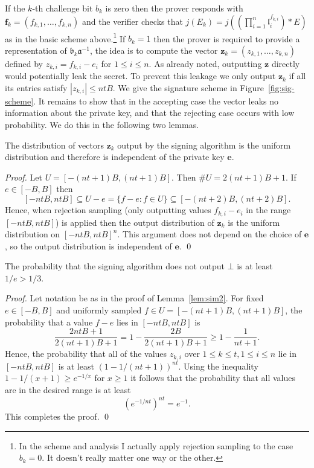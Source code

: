 \documentclass{llncs}
\renewcommand{\a}{\mathfrak{a}}
\renewcommand{\b}{\mathfrak{b}}
\renewcommand{\l}{\mathfrak{l}}
\newcommand{\e}{\textbf{e}}
\newcommand{\f}{\textbf{f}}
\newcommand{\z}{\textbf{z}}
\begin{document}
If the $k$-th challenge bit $b_k$ is zero then the prover responds with $\f_k = ( f_{k,1}, \dots, f_{k,n} )$ and the verifier checks that $j(E_k) = j( (\prod_{i=1}^n \l_i^{f_{k,i}}) * E )$ as in the basic scheme above.\footnote{In the scheme and analysis I actually apply rejection sampling to the case $b_k = 0$. It doesn't really matter one way or the other.}
If $b_k = 1$ then the prover is required to provide a representation of $\b_k \a^{-1}$, the idea is to compute the vector $\z_k = (z_{k,1}, \dots, z_{k,n}) $ defined by $z_{k,i} = f_{k,i} - e_i $ for $1 \le i \le n$.
As already noted, outputting $\z$ directly would potentially leak the secret.
To prevent this leakage we only output $\z_k$ if all its entries satisfy $| z_{k,i} | \le nt B$.
We give the signature scheme in Figure~\ref{fig:sig-scheme}.
It remains to show that in the accepting case the vector leaks no information about the private key, and that the rejecting case occurs with low probability. We do this in the following two lemmas.

\begin{lemma} \label{lem:sim2}
The distribution of vectors $\z_k$ output by the signing algorithm is the uniform distribution and therefore is independent of the private key $\e$.
\end{lemma}

\begin{proof}
Let $U = [-(nt+1)B, (nt+1)B]$. Then $\#U = 2(nt + 1)B + 1$.
If $e \in [-B, B]$ then 
\[
    [-ntB, ntB] \subseteq  U - e = \{ f - e : f \in U \} \subseteq [-(nt+2)B, (nt+2)B ].
\]
Hence, when rejection sampling (only outputting values $f_{k,i} - e_i$ in the range $[-ntB, ntB]$) is applied then the output distribution of $\z_k$ is the uniform distribution on $[-ntB, ntB]^n$.
This argument does not depend on the choice of $\e$, so the output distribution is independent of $\e$. \qed
\end{proof}



\begin{lemma}\label{lem:rejection}
The probability that the signing algorithm does not output $\bot$ is at least $1/e > 1/3$.
\end{lemma}

\begin{proof}
Let notation be as in the proof of Lemma~\ref{lem:sim2}.
For fixed $e \in [-B, B]$ and uniformly sampled $f \in U = [-(nt+1)B, (nt+1)B]$, the probability that a value $f-e$ lies in $[-ntB, ntB]$ is
\[
   \frac{2ntB + 1}{2(nt+1)B + 1}  = 1 - \frac{2B}{2(nt+1)B + 1} \ge 1 - \frac{1}{nt+1}.
\]
Hence, the probability that all of the values $z_{k,i}$ over $1 \le k \le t, 1 \le i \le n$ lie in $[-ntB, ntB]$ is at least $(1 - 1/(nt+1))^{nt}$.
Using the inequality $1 - 1/(x+1) \ge e^{-1/x}$ for $x \ge 1$ it follows that the probability that all values are in the desired range is at least
\[
   \left( e^{-1/nt} \right)^{nt} = e^{-1}.
\]
This completes the proof. \qed
\end{proof}
\end{document}

